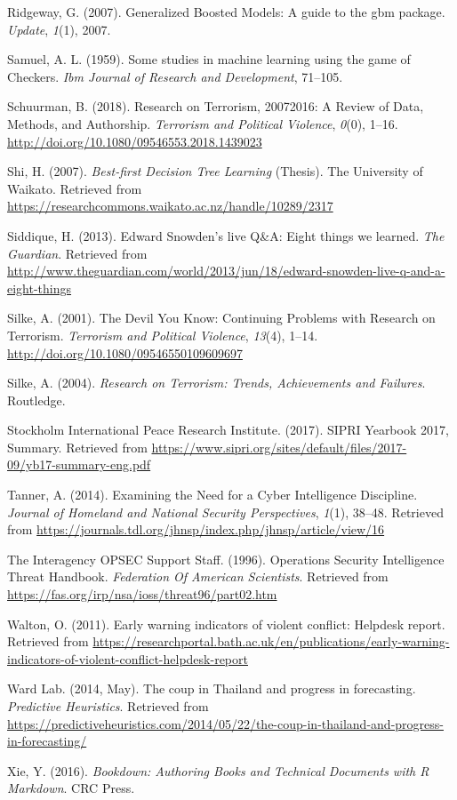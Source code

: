 \documentclass[11pt,oneside,a4paper]{reedthesis}
\begin{document}
\hypertarget{ref-Ridgeway_2007}{}
Ridgeway, G. (2007). Generalized Boosted Models: A guide to the gbm
package. \emph{Update}, \emph{1}(1), 2007.

\hypertarget{ref-Samuel_1959}{}
Samuel, A. L. (1959). Some studies in machine learning using the game of
Checkers. \emph{Ibm Journal of Research and Development}, 71--105.

\hypertarget{ref-Schuurman_2018}{}
Schuurman, B. (2018). Research on Terrorism, 20072016: A Review of Data,
Methods, and Authorship. \emph{Terrorism and Political Violence},
\emph{0}(0), 1--16. \url{http://doi.org/10.1080/09546553.2018.1439023}

\hypertarget{ref-Shi_2007}{}
Shi, H. (2007). \emph{Best-first Decision Tree Learning} (Thesis). The
University of Waikato. Retrieved from
\url{https://researchcommons.waikato.ac.nz/handle/10289/2317}

\hypertarget{ref-Siddique_2013}{}
Siddique, H. (2013). Edward Snowden's live Q\&A: Eight things we
learned. \emph{The Guardian}. Retrieved from
\url{http://www.theguardian.com/world/2013/jun/18/edward-snowden-live-q-and-a-eight-things}

\hypertarget{ref-Silke_2001}{}
Silke, A. (2001). The Devil You Know: Continuing Problems with Research
on Terrorism. \emph{Terrorism and Political Violence}, \emph{13}(4),
1--14. \url{http://doi.org/10.1080/09546550109609697}

\hypertarget{ref-Silke_2004}{}
Silke, A. (2004). \emph{Research on Terrorism: Trends, Achievements and
Failures}. Routledge.

\hypertarget{ref-StockholmInternationalPeaceResearchInstitute_2017}{}
Stockholm International Peace Research Institute. (2017). SIPRI Yearbook
2017, Summary. Retrieved from
\url{https://www.sipri.org/sites/default/files/2017-09/yb17-summary-eng.pdf}

\hypertarget{ref-Tanner_2014}{}
Tanner, A. (2014). Examining the Need for a Cyber Intelligence
Discipline. \emph{Journal of Homeland and National Security
Perspectives}, \emph{1}(1), 38--48. Retrieved from
\url{https://journals.tdl.org/jhnsp/index.php/jhnsp/article/view/16}

\hypertarget{ref-TheInteragencyOPSECSupportStaff_1996}{}
The Interagency OPSEC Support Staff. (1996). Operations Security
Intelligence Threat Handbook. \emph{Federation Of American Scientists}.
Retrieved from \url{https://fas.org/irp/nsa/ioss/threat96/part02.htm}

\hypertarget{ref-Walton_2011}{}
Walton, O. (2011). Early warning indicators of violent conflict:
Helpdesk report. Retrieved from
\url{https://researchportal.bath.ac.uk/en/publications/early-warning-indicators-of-violent-conflict-helpdesk-report}

\hypertarget{ref-WardLab_2014}{}
Ward Lab. (2014, May). The coup in Thailand and progress in forecasting.
\emph{Predictive Heuristics}. Retrieved from
\url{https://predictiveheuristics.com/2014/05/22/the-coup-in-thailand-and-progress-in-forecasting/}

\hypertarget{ref-Xie_2016}{}
Xie, Y. (2016). \emph{Bookdown: Authoring Books and Technical Documents
with R Markdown}. CRC Press.


\end{document}
